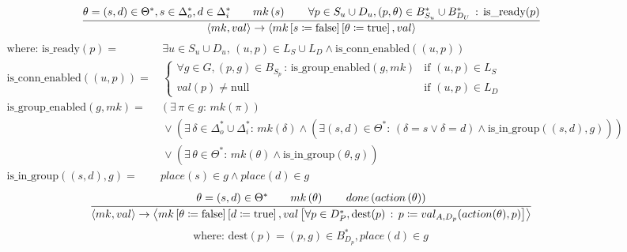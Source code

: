 {%
\begin{figure}[tp]
%
\begin{equation}
\cfrac{\theta =\left(s,d\right) \in \Theta^*,s \in \Delta_o^*,d \in \Delta_i^*\qquad mk\left(s\right)\qquad\forall p \in S_{u}\cup D_{u},\left(p,\theta\right)\in B_{S_{u}}^{*}\cup B_{D_{U}}^{*}\,:\,\text{is\_ready}(p)}{\left\langle mk,val\right\rangle \rightarrow\left\langle mk\left[s\coloneqq\text{false}\right]\left[\theta\coloneqq\text{true}\right],val\right\rangle }
\label{eq:r1}
\end{equation}
%
\begin{align*}
  \text{where: }\text{is\_ready}(p) = &\, \exists u\in S_u\cup D_u,\,(u,p)\in L_{S}\cup L_D\land \text{is\_conn\_enabled}\left((u,p)\right) \\
  \text{is\_conn\_enabled}\left((u,p)\right) = &\, \begin{cases}
\forall g\in G,\left(p,g\right)\in B_{S_{p}}\,:\,\text{is\_group\_enabled}\left(g,mk\right) & \text{if }\left(u,p\right)\in L_{S}\\
val\left(p\right)\neq\text{null} & \text{if }\left(u,p\right)\in L_D
\end{cases} \\
\text{is\_group\_enabled}\left(g,mk\right) = & \left(\exists\,\pi\in g:\,mk\left(\pi\right)\right)\\
 & \, \lor\left(\exists\,\delta\in\Delta_{o}^{*}\cup\Delta_{i}^{*}:\,mk\left(\delta\right)\land \left(\exists(s,d)\in\Theta^{*}:\,\left(\delta=s\lor \delta=d\right)\land \text{is\_in\_group}\left((s,d),g\right)\right)\right)\\
 & \, \lor\left(\exists\,\theta\in\Theta^{*}:\,mk\left(\theta\right)\land \text{is\_in\_group}\left(\theta,g\right)\right) \\
\text{is\_in\_group}\left((s,d),g\right) = & place\left(s\right)\in g\land place\left(d\right)\in g
\end{align*}
%
\begin{equation}
\cfrac{\theta=\left(s,d\right) \in \Theta^*\qquad mk\left(\theta\right)\qquad done\left(action\left(\theta\right)\right)}{\left\langle mk,val\right\rangle \rightarrow\left\langle mk\left[\theta\coloneqq\text{false}\right]\left[d\coloneqq\text{true}\right],val\left[\forall p\in D_P^*,\text{dest}(p)\,:\, p\coloneqq val_{A,D_p}(action(\theta),p)\right]\right\rangle}
\label{eq:r2}
\end{equation}
%
\begin{equation*}
  \text{where: }\text{dest}(p) = \left(p,g\right)\in B_{D_{p}}^*,place(d)\in g

\end{equation*}
\end{figure}}
